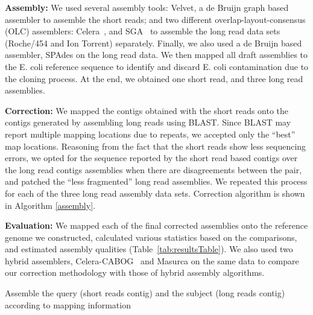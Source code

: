 \documentclass[12pt,a4paper]{cibb}
\begin{document}
\textbf{Assembly:} We used several assembly tools: Velvet\cite{velvetZerbino:2008}, a de Bruijn graph based assembler to assemble the short reads; and two different overlap-layout-consensus (OLC) assemblers: Celera~\cite{celera:2000}, and SGA~\cite{sga:2012} to assemble the long read data sets (Roche/454 and Ion Torrent) separately. Finally, we also used a de Bruijn based assembler, SPAdes\cite{spadesBankevich:2012} on the long read data. 
We then mapped all draft assemblies to the E. coli reference sequence to identify and discard E. coli contamination due to the cloning process. At the end, we obtained one short read, and three long read assemblies.

\textbf{Correction:} We mapped the contigs obtained with the short reads onto the contigs generated by assembling long reads using BLAST\cite{blast}. Since BLAST may report multiple mapping locations due to repeats, we accepted only the ``best'' map locations. Reasoning from the fact that the short reads show less sequencing errors, we opted for the sequence reported by the short read based contigs over the long read contigs assemblies when there are disagreements between the pair, and patched the ``less fragmented'' long read assemblies. We repeated this process for each of the three long read assembly data sets. Correction algorithm is shown in Algorithm \ref{assembly}. 

\textbf{Evaluation:} We mapped each of the final corrected assemblies onto the reference genome we constructed, calculated various statistics based on the comparisons, and estimated assembly qualities (Table~\ref{tab:resultsTable}). We also used  two hybrid assemblers, Celera-CABOG~\cite{cabogMiller:2008} and Masurca \cite{masurcaZimin:2013} on the same data to compare our correction methodology with those of hybrid assembly algorithms.

\begin{algorithm}
\caption{Assemble the query (short reads contig) and the subject (long reads contig) according to mapping information}
\label{assembly}
\begin{algorithmic} 
\ENDIF
{}
\ENDIF
{}
\ENDIF
{}
\ENDIF
\end{algorithmic}
\end{algorithm}
\end{document}

